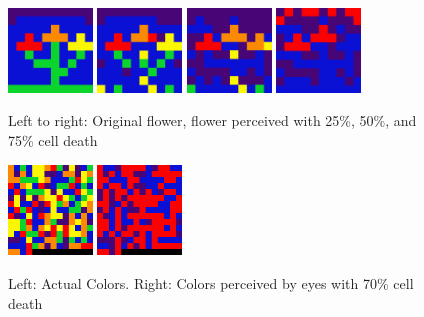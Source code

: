 \documentclass[titlepage]{article}
\begin{document}
\begin{figure}[H]
    \centering
    \includegraphics[width=0.2\textwidth]{figs/original_flower.png}
    \includegraphics[width=0.2\textwidth]{figs/flower_25.png}
    \includegraphics[width=0.2\textwidth]{figs/flower_50.png}
    \includegraphics[width=0.2\textwidth]{figs/flower_75.png}
    \caption{Left to right: Original flower, flower perceived with 25\%, 50\%, and 75\% cell death}
\end{figure}

\begin{figure}[H]
    \centering
    \includegraphics[width=0.2\textwidth]{figs/damage70_actual_results.png}
    \includegraphics[width=0.2\textwidth]{figs/damage70_predicted_results.png}
    \caption{Left: Actual Colors. Right: Colors perceived by eyes with 70\% cell death}
\end{figure}
\end{document}

